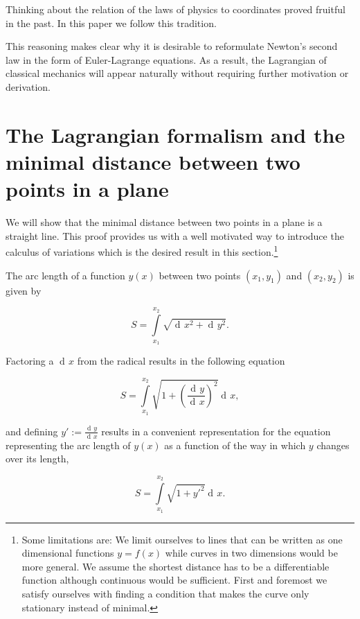 \documentclass[prb,preprint]{revtex4-1}
\DeclareMathOperator{\dd}{d\!}
\begin{document}
Thinking about the relation of the laws of physics to coordinates proved fruitful in the past. In this paper we follow this tradition. 


This reasoning makes clear why it is desirable to reformulate Newton's second law in the form of Euler-Lagrange equations. As a result, the Lagrangian of classical mechanics will appear naturally without requiring further motivation or derivation.


\section{The Lagrangian formalism and the minimal distance between two points in a plane \cite{Klopper}}\label{distance}

We will show that the minimal distance between two points in a plane is a straight line. This proof provides us with a well motivated way to introduce the calculus of variations which is the desired result in this section.\footnote{Some limitations are:
We limit ourselves to lines that can be written as one dimensional functions $y=f(x)$ while curves in two dimensions would be more general. We assume the shortest distance has to be a differentiable function although continuous would be sufficient. First and foremost we satisfy ourselves with finding a condition that makes the curve only stationary instead of minimal.}

The arc length of a function $y(x)$ between two points $(x_1,y_1)$ and $(x_2,y_2)$ is given by

\begin{equation}
S=\int\limits_{x_1}^{x_2}\sqrt{\dd x^2 + \dd y^2}.
\end{equation}

Factoring a $\dd x$ from the radical results in the following equation

\begin{equation}
S= \int\limits_{x_1}^{x_2}\sqrt{1 + \left(\frac{\dd y}{\dd x}\right)^2} \dd x,
\end{equation}

and defining $y' := \frac{\dd y}{\dd x}$ results in a convenient representation for the equation representing the arc length of $y(x)$ as a function of the way in which $y$ changes over its length, %

\begin{equation}
S = \int\limits_{x_1}^{x_2}\sqrt{1 + y'^2} \dd x.
\end{equation}
\end{document}
